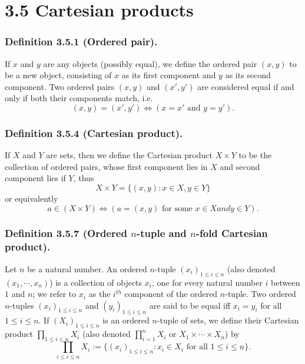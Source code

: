 \documentclass[12pt, letter]{article}
\begin{document}
\section*{3.5 Cartesian products}
\subsubsection*{Definition 3.5.1 (Ordered pair).}
If $x$ and $y$ are any objects (possibly equal), we define the ordered pair $(x,y)$ to be a new object, consisting of $x$
as its first component and $y$ as its second component. Two ordered pairs $(x,y)$ and $(x',y')$ are considered equal if and only if 
both their components match, i.e.
\begin{equation*}
    (x,y)=(x',y')\iff (x=x'\text{ and }y=y').
\end{equation*}
\subsubsection*{Definition 3.5.4 (Cartesian product).}
If $X$ and $Y$ are sets, then we define the Cartesian product $X\times Y$ to be the collection of ordered pairs, whose first component
lies in $X$ and second component lies if $Y$, thus
\begin{equation*}
    X\times Y=\{(x,y):x\in X, y\in Y\}
\end{equation*}
or equivalently
\begin{equation*}
    a\in (X\times Y)\iff (a=(x,y) \text{ for some } x\in X and y\in Y).
\end{equation*}
\subsubsection*{Definition 3.5.7 (Ordered $n$-tuple and $n$-fold Cartesian product).}
Let $n$ be a natural number. An ordered $n$-tuple $(x_i)_{1\leq i\leq n}$ (also denoted $(x_1,\cdots, x_n)$) is a collection of objects $x_i$,
one for every natural number $i$ between $1$ and $n$; we refer to $x_i$ as the $i^{th}$ component of the ordered $n$-tuple. Two 
ordered $n$-tuples $(x_i)_{1\leq i\leq n}$ and $(y_i)_{1\leq i\leq n}$ are said to be equal iff $x_i=y_i$ for all $1\leq i\leq n$. 
If $(X_i)_{1\leq i\leq n}$ is an ordered $n$-tuple of sets, we define their Cartesian product $\prod_{1\leq i\leq n}X_i$ (also denoted 
$\prod_{i=1}^{n}X_i$ or $X_1\times \cdots \times X_n$) by
\begin{equation*}
    \prod_{i\leq i\leq n}X_i:=\{(x_i)_{1\leq i\leq n}:x_i\in X_i\text{ for all }1\leq i\leq n\}.
\end{equation*}
\end{document}
